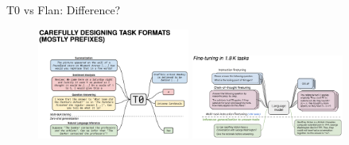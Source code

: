 \begin{frame}{T0 vs Flan: Difference?}

\vfill
	
	\begin{figure}
		\includegraphics[width=5cm]{figure/t0comparison}
		\includegraphics[width=5cm]{figure/flancomparison}
	\end{figure}

\vfill

\end{frame}



\def\myblue#1{\textcolor{texblue}{#1}}

